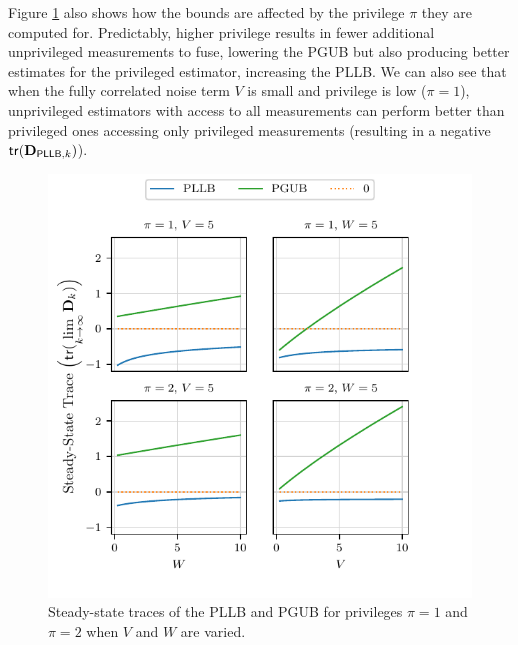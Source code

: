 Figure \ref{fig:priv_estimation:fus_trace_params} also shows how the bounds are affected by the privilege $\pi$ they are computed for. Predictably, higher privilege results in fewer additional unprivileged measurements to fuse, lowering the PGUB but also producing better estimates for the privileged estimator, increasing the PLLB. We can also see that when the fully correlated noise term $V$ is small and privilege is low ($\pi=1$), unprivileged estimators with access to all measurements can perform better than privileged ones accessing only privileged measurements (resulting in a negative $\mathsf{tr}({{\mathbf{D}}}_{\mathsf{PLLB},k})$).
\begin{figure}[htbp]
  \centering
  \includegraphics{figures/priv_estimation_fus_trace_params.pdf}
  \caption{Steady-state traces of the PLLB and PGUB for privileges $\pi=1$ and $\pi=2$ when $V$ and $W$ are varied.}
  \label{fig:priv_estimation:fus_trace_params}
\end{figure}

% 
%                                               
%                                               
%                                               
% 

